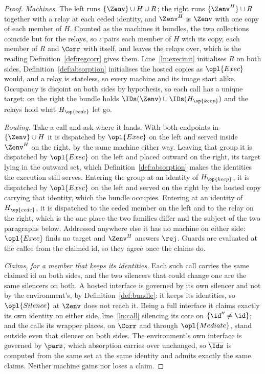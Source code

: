 \documentclass[10pt,oneside,openany]{book}
\theoremstyle{accentdef}
\theoremstyle{accentplain}
\begin{document}
\begin{proof}
\emph{Machines.} The left runs $\{\Zenv\} \cup H \cup R$; the right runs $\{\Zenv^{H}\} \cup R$
together with a relay at each ceded identity, and $\Zenv^{H}$ is $\Zenv$ with one copy of each member
of $H$. Counted as the machines it bundles, the two collections coincide but for the relays, so
$\iota$ pairs each member of $H$ with its copy, each member of $R$ and $\Corr$ with itself, and
leaves the relays over, which is the reading Definition~\ref{def:regcorr} gives them.
Line~\ref{ln:execinit} initialises $R$ on both sides, Definition~\ref{def:absorption} initialises the
hosted copies as $\opl{Exec}$ would, and a relay is stateless, so every machine and its image start
alike. Occupancy is disjoint on both sides by hypothesis, so each call has a unique target: on the
right the bundle holds $\IDs(\Zenv) \cup \IDs(H_{\op{keep}})$ and the relays hold what
$H_{\op{cede}}$ let go.

\emph{Routing.} Take a call and ask where it lands. With both endpoints in $\{\Zenv\} \cup H$ it is
dispatched by $\opl{Exec}$ on the left and served inside $\Zenv^{H}$ on the right, by the same machine
either way. Leaving that group it is dispatched by $\opl{Exec}$ on the left and placed outward on the
right, its target lying in the outward set, which Definition~\ref{def:absorption} makes the identities
the execution still serves. Entering the group at an identity of $H_{\op{keep}}$, it is dispatched by
$\opl{Exec}$ on the left and served on the right by the hosted copy carrying that identity, which the
bundle occupies. Entering at an identity of $H_{\op{cede}}$, it is dispatched to the ceded member on
the left and to the relay on the right, which is the one place the two families differ and the
subject of the two paragraphs below. Addressed anywhere else it has no machine on either side:
$\opl{Exec}$ finds no target and $\Zenv^{H}$ answers $\rej$. Guards are evaluated at the callee from
the claimed id, so they agree once the claims do.

\emph{Claims, for a member that keeps its identities.} Each such call carries the same claimed id on
both sides, and the two silencers that could change one are the same silencers on both. A hosted
interface is governed by its own silencer and not by the environment's, by
Definition~\ref{def:bundle}: it keeps its identities, so $\opl{Silence}$ at $\Zenv$ does not reach it.
Being a full interface it claims exactly its own identity on either side, line~\ref{ln:call} silencing
its core on $\{\id'' \neq \id\}$; and the calls its wrapper places, on $\Corr$ and through
$\opl{Mediate}$, stand outside even that silencer on both sides. The environment's own interface is
governed by $\pars$, which absorption carries over unchanged, so $\overline{\Ids}$ is computed from
the same set at the same identity and admits exactly the same claims. Neither machine gains nor loses
a claim.


\end{proof}
\end{document}
